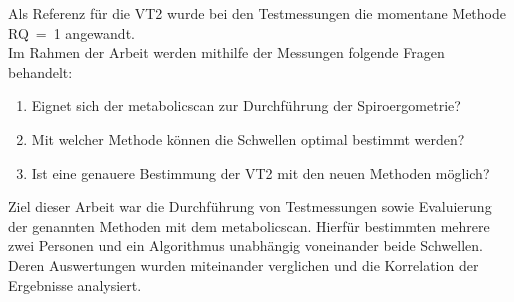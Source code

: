 %
Als Referenz für die VT2 wurde bei den Testmessungen die momentane Methode RQ~=~1 angewandt.\\
Im Rahmen der Arbeit werden mithilfe der Messungen folgende Fragen behandelt:
%
\begin{enumerate}
	\item Eignet sich der metabolicscan zur Durchführung der Spiroergometrie?
	\item Mit welcher Methode können die Schwellen optimal bestimmt werden?
	\item Ist eine genauere Bestimmung der VT2 mit den neuen Methoden möglich?
\end{enumerate}
%
Ziel dieser Arbeit war die Durchführung von Testmessungen sowie Evaluierung der genannten Methoden mit dem metabolicscan. Hierfür bestimmten mehrere zwei Personen und ein Algorithmus unabhängig voneinander beide Schwellen. Deren Auswertungen wurden miteinander verglichen und die Korrelation der Ergebnisse analysiert.
\clearpage